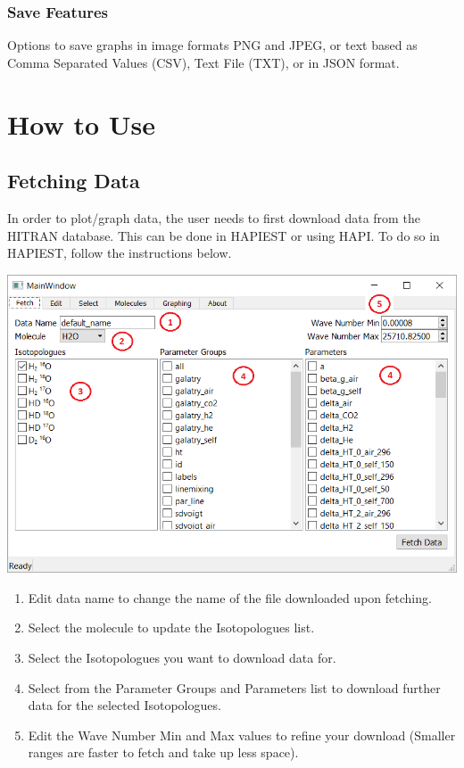 \documentclass[12pt]{article}
\begin{document}
\subsubsection*{Save Features}
Options to save graphs in image formats PNG and JPEG, or  text based as Comma Separated Values (CSV), Text File (TXT), or in JSON format.
\newpage

\section{How to Use}

\subsection{Fetching Data}
In order to plot/graph data, the user needs to first download data from the HITRAN database. This can be done in HAPIEST or using HAPI. To do so in HAPIEST, follow the instructions below.
\begin{center}
\includegraphics[scale = 0.6]{MainWindow_FetchGuide}
\end{center}
\begin{enumerate}
\item Edit data name to change the name of the file downloaded upon fetching.
\item Select the molecule to update the Isotopologues list.
\item Select the Isotopologues you want to download data for.
\item Select from the Parameter Groups and Parameters list to download further data for the selected Isotopologues.
\item Edit the Wave Number Min and Max values to refine your download (Smaller ranges are faster to fetch and take up less space).
\end{enumerate}
\newpage
\end{document}
